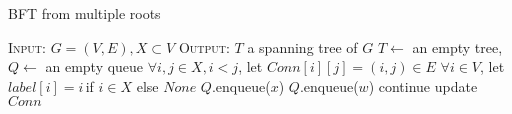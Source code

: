 \documentclass[a4paper,draft,notitlepage,11pt,svgnames]{scrartcl}
\begin{document}
\begin{algorithm}
	\caption{BFT from multiple roots \label{alg:mbfs}}
	\begin{algorithmic}[0]
		\State \textsc{Input:} $G=(V, E), X \subset V$
		\State \textsc{Output:} $T$ a spanning tree of $G$
		\State $T \gets$ an empty tree, $Q \gets$ an empty queue
		\State $\forall i,j \in X, i<j$, let $Conn[i][j] = (i, j) \in E$
		\State $\forall i \in V$, let $label[i] = i \,$if $i\in X$ else $None$
			\State $Q$.enqueue($x$)
		\EndFor
					\State $Q$.enqueue($w$)
					\State continue
				\Else {}
					\State update $Conn$
				\EndIf
			\EndFor
		\EndWhile
	\end{algorithmic}
\end{algorithm}
\end{document}
